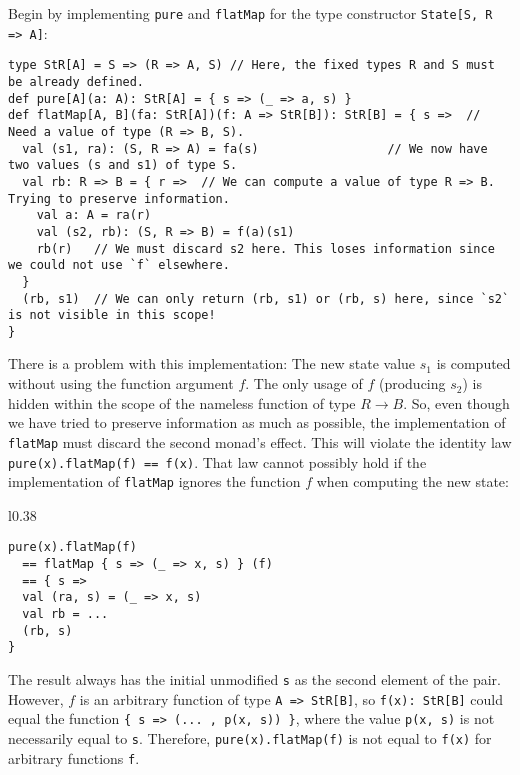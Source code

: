 Begin by implementing \lstinline!pure! and \lstinline!flatMap! for
the type constructor \lstinline!State[S, R => A]!:
\begin{lstlisting}
type StR[A] = S => (R => A, S) // Here, the fixed types R and S must be already defined.
def pure[A](a: A): StR[A] = { s => (_ => a, s) }
def flatMap[A, B](fa: StR[A])(f: A => StR[B]): StR[B] = { s =>  // Need a value of type (R => B, S).
  val (s1, ra): (S, R => A) = fa(s)                  // We now have two values (s and s1) of type S.
  val rb: R => B = { r =>  // We can compute a value of type R => B. Trying to preserve information.
    val a: A = ra(r)
    val (s2, rb): (S, R => B) = f(a)(s1)
    rb(r)   // We must discard s2 here. This loses information since we could not use `f` elsewhere.
  }
  (rb, s1)  // We can only return (rb, s1) or (rb, s) here, since `s2` is not visible in this scope!
}
\end{lstlisting}
There is a problem with this implementation: The new state value $s_{1}$
is computed without using the function argument $f$. The only usage
of $f$ (producing $s_{2}$) is hidden within the scope of the nameless
function of type $R\rightarrow B$. So, even though we have tried
to preserve information as much as possible, the implementation of
\lstinline!flatMap! must discard the second monad\textsf{'}s effect. This
will violate the identity law \lstinline!pure(x).flatMap(f) == f(x)!.
That law cannot possibly hold if the implementation of \lstinline!flatMap!
ignores the function $f$ when computing the new state:

\begin{wrapfigure}{l}{0.38\columnwidth}%
\vspace{-1\baselineskip}
\begin{lstlisting}
pure(x).flatMap(f)
  == flatMap { s => (_ => x, s) } (f)
  == { s =>
  val (ra, s) = (_ => x, s)
  val rb = ...
  (rb, s)
}
\end{lstlisting}

\vspace{-1.5\baselineskip}
\end{wrapfigure}%

\noindent The result always has the initial unmodified \lstinline!s!
as the second element of the pair. However, $f$ is an arbitrary function
of type \lstinline!A => StR[B]!, so \lstinline!f(x): StR[B]! could
equal the function \lstinline!{ s => (... , p(x, s)) }!, where the
value \lstinline!p(x, s)! is not necessarily equal to \lstinline!s!.
Therefore, \lstinline!pure(x).flatMap(f)! is not equal to \lstinline!f(x)!
for arbitrary functions \lstinline!f!.

